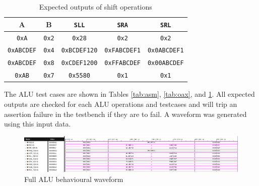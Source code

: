 \documentclass[CMPE]{../KGCOEReport}
\def\code#1{\texttt{#1}}
\begin{document}
    \begin{table}[H]
        \renewcommand{\arraystretch}{1.2}
        \setlength{\tabcolsep}{12pt}
        \caption{Expected outputs of shift operations}
        \begin{center}
            \begin{tabular}{|c|c||c|c|c|}
                \hline
A & B & \code{SLL} & \code{SRA} & \code{SRL}\\\hline

	\code{0xA} & \code{0x2} & \code{0x28} & \code{0x2} & \code{0x2}\\\hline

	\code{0xABCDEF} & \code{0x4} & \code{0xBCDEF120} & \code{0xFABCDEF1} & \code{0x0ABCDEF1}
	\\\hline

	\code{0xABCDEF} & \code{0x8} & \code{0xCDEF1200} & \code{0xFFABCDEF} & \code{0x00ABCDEF}
	\\\hline

	\code{0xAB} & \code{0x7} & \code{0x5580} & \code{0x1} & \code{0x1}
	\\\hline

            \end{tabular}
        \end{center}
        \label{tab:sss}
    \end{table}
    
    The ALU test cases are shown in Tables \ref{tab:asm}, \ref{tab:oax}, and \ref{tab:sss}.
    All expected outputs are checked for each ALU operations and testcases and will trip
    an assertion failure in the testbench if they are to fail.
    A waveform was generated using this input data.
    
    \begin{figure}[h!]
        \centering
        \includegraphics[width=\textwidth]{img/alu_full_behav}
        \caption{Full ALU behavioural waveform}
        \label{fig:alu_behav}
    \end{figure}
    
\end{document}
